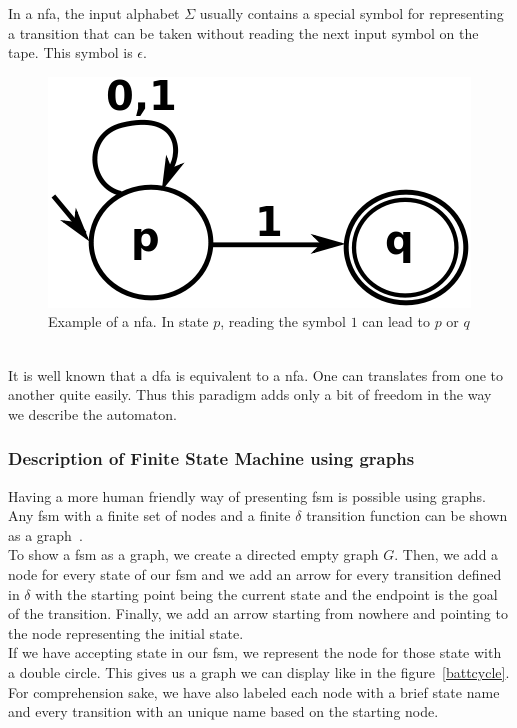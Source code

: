 \documentclass[12pt]{article}
\begin{document}
In a \gls{nfa}, the input alphabet $\Sigma$ usually contains a special symbol for representing a transition that can be taken without reading the next input symbol on the tape. This symbol is $\epsilon$.\\

\begin{figure}
    \centering
    \includegraphics[scale=0.4]{graph/nfa.png}
    \caption{Example of a \gls{nfa}. In state $p$, reading the symbol $1$ can lead to $p$ or $q$~\cite{NFA:2017}}
    \label{nfa}
\end{figure}

It is well known that a \gls{dfa} is equivalent to a \gls{nfa}. One can translates from one to another quite easily. Thus this paradigm adds only a bit of freedom in the way we describe the automaton.\\

\subsubsection{Description of Finite State Machine using graphs}

Having a more human friendly way of presenting \gls{fsm} is possible using graphs. Any \gls{fsm} with a finite set of nodes and a finite $\delta$ transition function can be shown as a graph~\cite{Keller-FSM}.\\

To show a \gls{fsm} as a graph, we create a directed empty graph $G$. Then, we add a node for every state of our \gls{fsm} and we add an arrow for every transition defined in $\delta$ with the starting point being the current state and the endpoint is the goal of the transition. Finally, we add an arrow starting from nowhere and pointing to the node representing the initial state.\\

If we have accepting state in our \gls{fsm}, we represent the node for those state with a double circle. This gives us a graph we can display like in the figure~\ref{battcycle}. For comprehension sake, we have also labeled each node with a brief state name and every transition with an unique name based on the starting node.
\end{document}
